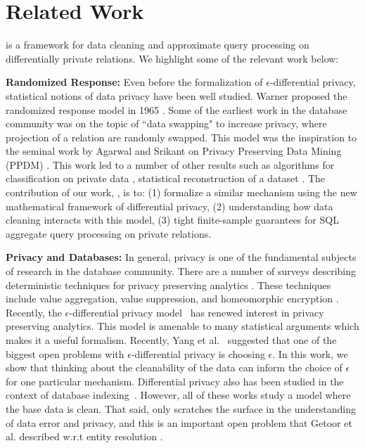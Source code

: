 \section{Related Work}
\sys is a framework for data cleaning and approximate query processing on differentially private relations.
We highlight some of the relevant work below:

\vspace{0.5em}

\noindent\textbf{Randomized Response: } Even before the formalization of $\epsilon$-differential privacy, statistical notions of data privacy have been well studied. Warner proposed the randomized response model in 1965 \cite{warner1965randomized}. Some of the earliest work in the database community was on the topic of ``data swapping" to increase privacy\cite{DBLP:conf/pods/ReissPD82}, where projection of a relation are randomly swapped. This model was the inspiration to the seminal work by Agarwal and Srikant on Privacy Preserving Data Mining (PPDM) \cite{DBLP:conf/sigmod/AgrawalS00}. This work led to a number of other results such as algorithms for classification on private data \cite{DBLP:conf/kdd/DuZ03}, statistical reconstruction of a dataset \cite{DBLP:conf/sigmod/HuangDC05}. The contribution of our work, \sys, is to: (1) formalize a similar mechanism using the new mathematical framework of differential privacy, (2) understanding how data cleaning interacts with this model,  (3) tight finite-sample guarantees for SQL aggregate query processing on private relations. 

\vspace{0.5em}

\noindent\textbf{Privacy and Databases: } In general, privacy is one of the fundamental subjects of research in the database community\cite{DBLP:journals/cacm/JagadishGLPPRS14}. There are a number of surveys describing deterministic techniques for privacy preserving analytics \cite{DBLP:journals/csur/FungWCY10, DBLP:series/ads/AggarwalY08a}. These techniques include value aggregation, value suppression, and homeomorphic encryption \cite{DBLP:conf/sosp/PopaRZB11, sweeney2002achieving, machanavajjhala2007diversity, li2007t}.
Recently, the $\epsilon$-differential privacy model~\cite{dwork2011differential} has renewed interest in privacy preserving analytics.
This model is amenable to many statistical arguments which makes it a useful formalism.
Recently, Yang et al.~\cite{DBLP:conf/sigmod/YangZMWX12} suggested that one of the biggest open problems with $\epsilon$-differential privacy is choosing $\epsilon$.
In this work, we show that thinking about the cleanability of the data can inform the choice of $\epsilon$ for one particular mechanism.
Differential privacy also has been studied in the context of database indexing~\cite{DBLP:conf/sigmod/PengYZWY12}.
However, all of these works study a model where the base data is clean.
That said, \sys only scratches the surface in the understanding of data error and privacy, and this is an important open problem that Getoor et al. described w.r.t entity resolution \cite{DBLP:journals/pvldb/GetoorM12}.

